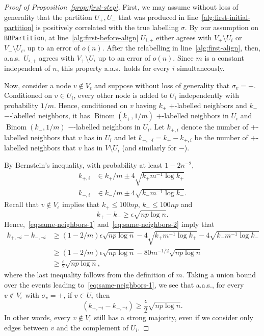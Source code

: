 \documentclass[EJP,final]{ejpecp}
\newcommand{\1}[1]{\mathbbm{1}_{\{#1\}}}
\DeclareMathOperator{\Binom}{Binom}
\newcommand{\noti}{\lnot i}
\begin{document}
\begin{proof}[Proof of Proposition~\ref{prop:first-step}]
 First, we may assume without loss of generality that
 the partition $U_+, U_-$ that was produced in
 line~\ref{alg:first-initial-partition} is positively correlated with the true labelling
 $\sigma$.
 By our assumption on \texttt{BBPartition}, at line~\ref{alg:first-before-align} $U_{i,+}$ either agrees with $V_+ \setminus U_i$ or $V_- \setminus U_i$,
 up to an error of $o(n)$. After the relabelling in
 line~\ref{alg:first-align}, then, a.a.s.\ $U_{i,+}$
 agrees with $V_+ \setminus U_i$ up to an error of $o(n)$.
 Since $m$ is a constant independent of $n$, this property a.a.s.\ holds
 for every $i$ simultaneously.

 Now, consider a node $v \not \in V_\epsilon$ and suppose
 without loss of generality that $\sigma_v = +$. Conditioned on $v \in U_i$,
 every other node is added to $U_i$ independently with probability $1/m$.
 Hence, conditioned on $v$ having $k_+$ $+$-labelled neighbors and $k_-$
 $-$-labelled neighbors,
 it has $\Binom(k_+, 1/m)$ $+$-labelled neighbors in $U_i$
 and $\Binom(k_-, 1/m)$ $-$-labelled neighbors in $U_i$.
 Let $k_{+,i}$ denote the number of $+$-labelled neighbors that $v$
 has in $U_i$ and let $k_{+,\noti} = k_+ - k_{+,i}$
 be the number of $+$-labelled neighbors that $v$ has in
 $V \setminus U_i$ (and similarly for $-$).

 By Bernstein's inequality, with probability at least $1-2n^{-2}$,
 \begin{align}
  \label{eq:same-neighbors-1}
  k_{+,i} &\in k_+/m \pm 4 \sqrt{k_+ m^{-1} \log k_+} \\
  \label{eq:same-neighbors-2}
  k_{-,i} &\in k_-/m \pm 4 \sqrt{k_- m^{-1} \log k_-}.
 \end{align}
 Recall that $v \not \in V_\epsilon$ implies that $k_+ \le 100np$,
 $k_- \le 100np$ and
 \[k_+ - k_- \ge \epsilon\sqrt{np\log n}.\]
 Hence,~\eqref{eq:same-neighbors-1} and~\eqref{eq:same-neighbors-2} imply that
 \begin{align*}
   k_{+,\noti} - k_{-,\noti}
   &\ge (1-2/m) \epsilon\sqrt{np \log n} - 4 \sqrt{k_+m^{-1} \log k_+} - 4 \sqrt{k_- m^{-1} \log k_-} \\
  &\ge (1-2/m) \epsilon\sqrt{np \log n} - 80 m^{-1/2} \sqrt{np \log n} \\
  &\ge \frac{\epsilon}{2} \sqrt{np \log n},
 \end{align*}
 where the last inequality follows from the definition of $m$.
 Taking a union bound over the events leading to~\eqref{eq:same-neighbors-1},
 we see that a.a.s., for every $v \not \in V_\epsilon$ with $\sigma_v = +$,
 if $v \in U_i$ then
 \begin{equation}\label{eq:first-step-large-mag}
   (k_{+,\noti} - k_{-,\noti})
  \ge \frac{\epsilon}{2} \sqrt{np \log n}.
 \end{equation}
 In other words, every $v \not \in V_\epsilon$ still has a strong majority,
 even if we consider only edges between $v$ and the complement of $U_i$.


\end{proof}
\end{document}
